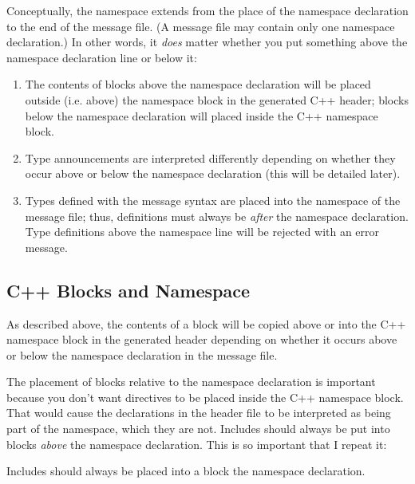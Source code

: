 Conceptually, the namespace extends from the place of the namespace
declaration to the end of the message file. (A message file may contain
only one namespace declaration.) In other words, it \textit{does} matter
whether you put something above the namespace declaration line or below it:

\begin{enumerate}
\item The contents of  blocks above the namespace
      declaration will be placed outside (i.e. above) the namespace block
      in the generated C++ header; blocks below the namespace declaration
      will placed inside the C++ namespace block.
\item Type announcements are interpreted differently depending on whether
      they occur above or below the namespace declaration (this will be
      detailed later).
\item Types defined with the message syntax are placed into the namespace
      of the message file; thus, definitions must always be \textit{after}
      the namespace declaration. Type definitions above the namespace line
      will be rejected with an error message.
\end{enumerate}

\subsection{C++ Blocks and Namespace}
\label{sec:msg-def:cpp-blocks-and-namespace}

As described above, the contents of a  block will be
copied above or into the C++ namespace block in the generated header
depending on whether it occurs above or below the namespace declaration in
the message file.

The placement of  blocks relative to the namespace
declaration is important because you don't want  directives
to be placed inside the C++ namespace block. That would cause the
declarations in the header file to be interpreted as being part of the
namespace, which they are not. Includes should always be put into
 blocks \textit{above} the namespace declaration. This is so
important that I repeat it:

\begin{important}
Includes should always be placed into a  block 
the namespace declaration.
\end{important}

